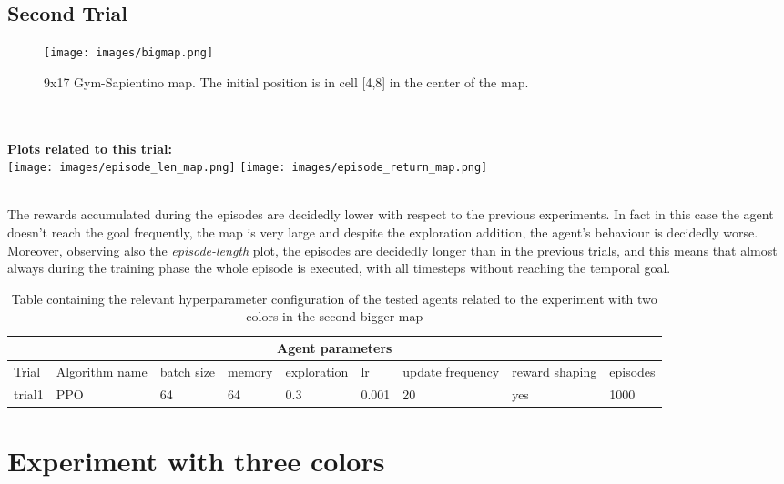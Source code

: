 \documentclass{article}
\begin{document}
\subsection{Second Trial}
\begin{figure}[h]
    \centering
    \texttt{[image: images/bigmap.png]}
    \caption{9x17 Gym-Sapientino map. The initial position is in cell [4,8] in the center of the map. }
    \label{fig:bigmap}
\end{figure}


\noindent\\ \\
\textbf{Plots related to this trial:}\\

\texttt{[image: images/episode\_len\_map.png]}
\texttt{[image: images/episode\_return\_map.png]}

\noindent\\
The rewards accumulated during the episodes are decidedly lower with respect to the previous experiments. In fact in this case the agent doesn't reach the goal frequently, the map is very large and despite the exploration addition, the agent's behaviour is decidedly worse.
Moreover, observing also the \textit{episode-length} plot, the episodes are decidedly longer than in the previous trials, and this means that almost always during the training phase the whole episode is executed, with all timesteps without  reaching the temporal goal.

\begin{table}[h]
\begin{tabular}{|p{1cm} |p{2cm}||p{1cm}|p{1.5cm}|p{2cm}|p{1cm}|p{1cm}|p{1cm}|p{1.1cm}|  }
 \hline
 \multicolumn{9}{|c|}{Agent parameters} \\
 \hline
Trial & Algorithm name & batch size & memory & exploration & lr & update frequency &reward shaping & episodes \\

\hline
trial1& PPO & 64 & 64 & 0.3 & 0.001 & 20&  yes &1000 \\
\hline
\end{tabular}
\caption{Table containing the relevant hyperparameter configuration of the tested agents related to the  experiment with two colors in the second bigger map}
\end{table}


\section{Experiment with three colors}
\end{document}
